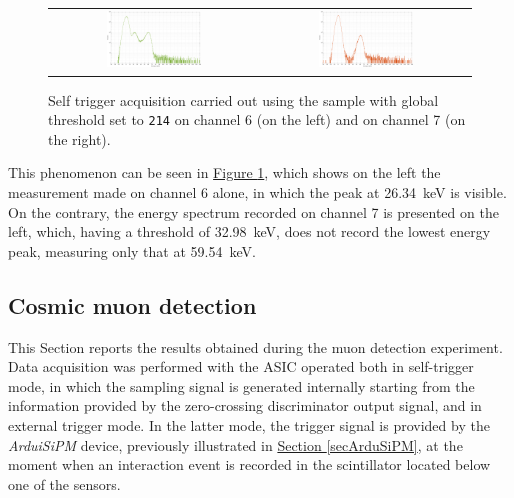 \begin{figure}[h!]
    \centering
    \begin{tabular}{cc}
        \includegraphics[width=0.47\textwidth]{Images/chap3/results/americio/ch4_americio_log_ch6.pdf} & \includegraphics[width=0.47\textwidth]{Images/chap3/results/americio/ch4_americio_log_ch7.pdf}\\
    \end{tabular}
    \caption{Self trigger acquisition carried out using the  sample with global threshold set to \texttt{214} on channel 6 (on the left) and on channel 7 (on the right).}
    \label{figAmericioCH6-7}
\end{figure}

\par
This phenomenon can be seen in \hyperref[figAmericioCH6-7]{Figure \ref{figAmericioCH6-7}}, which shows on the left the measurement made on channel 6 alone, in which the peak at \SI{26.34}{\kilo\electronvolt} is visible. On the contrary, the energy spectrum recorded on channel 7 is presented on the left, which, having a threshold of \SI{32.98}{\kilo\electronvolt}, does not record the lowest energy peak, measuring only that at \SI{59.54}{\kilo\electronvolt}.

\subsection{Cosmic muon detection}
\label{secMuonDetectionResults}

This Section reports the results obtained during the muon detection experiment. Data acquisition was performed with the ASIC operated both in self-trigger mode, in which the sampling signal is generated internally starting from the information provided by the zero-crossing discriminator output signal, and in external trigger mode. In the latter mode, the trigger signal is provided by the \textit{ArduiSiPM} device, previously illustrated in \hyperref[secArduSiPM]{Section \ref{secArduSiPM}}, at the moment when an interaction event is recorded in the scintillator located below one of the sensors.

